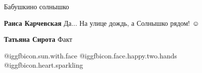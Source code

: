  
 
 
 
 

Бабушкино солнышко

\textbf{Раиса Карчевская} Да... На улице дождь, а Солнышко рядом! ☺ ️ 

\textbf{Татьяна Сирота} Факт

 @igg{fbicon.sun.with.face}  @igg{fbicon.face.happy.two.hands}  @igg{fbicon.heart.sparkling} 

